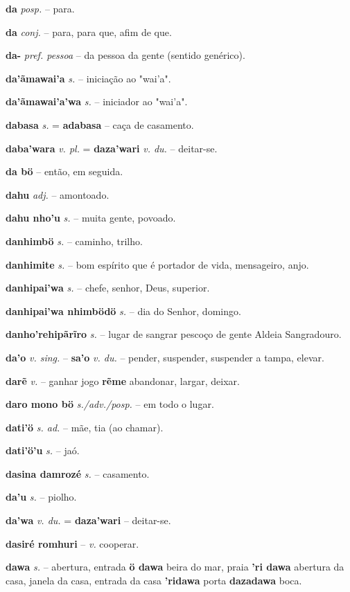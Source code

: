 \textbf{da} \textit{posp.} -- para.

\textbf{da} \textit{conj.} -- para, para que, afim de que.

\textbf{da-} \textit{pref. pessoa} -- da pessoa  da gente (sentido genérico).

\textbf{da'ãmawai'a} \textit{s.} -- iniciação ao "wai'a".

\textbf{da'ãmawai'a'wa} \textit{s.} -- iniciador ao "wai'a".

\textbf{dabasa} \textit{s.} = \textbf{adabasa} -- caça de casamento.

\textbf{daba'wara} \textit{v. pl.} = \textbf{daza'wari} \textit{v. du.} -- deitar-se.

\textbf{da bö} -- então, em seguida.

\textbf{dahu} \textit{adj.} -- amontoado.

\textbf{dahu nho'u} \textit{s.} -- muita gente, povoado.

\textbf{danhimbö} \textit{s.} -- caminho, trilho.

\textbf{danhimite} \textit{s.} -- bom espírito que é portador de vida, mensageiro, anjo.

\textbf{danhipai'wa} \textit{s.} -- chefe, senhor, Deus, superior.

\textbf{danhipai'wa nhimbödö} \textit{s.} -- dia do Senhor, domingo.

\textbf{danho'rehipãrĩro} \textit{s.} -- lugar de sangrar pescoço de gente  Aldeia Sangradouro.

\textbf{da'o} \textit{v. sing.} -- \textbf{sa'o} \textit{v. du.} -- pender, suspender, suspender a tampa, elevar.

\textbf{darẽ} \textit{v.} -- ganhar jogo  \textbf{rẽme} abandonar, largar, deixar.

\textbf{daro mono bö} \textit{s./adv./posp.} -- em todo o lugar.

\textbf{dati'ö} \textit{s. ad.} -- mãe, tia (ao chamar).

\textbf{dati'ö'u} \textit{s.} -- jaó.

\textbf{dasina damrozé} \textit{s.} -- casamento.

\textbf{da'u} \textit{s.} -- piolho.

\textbf{da'wa} \textit{v. du.} = \textbf{daza'wari} -- deitar-se.

\textbf{dasiré romhuri} -- \textit{v.} cooperar.

\textbf{dawa} \textit{s.} -- abertura, entrada  \textbf{ö dawa} beira do mar, praia  \textbf{'ri dawa} abertura da casa, janela da casa, entrada da casa  \textbf{'ridawa} porta  \textbf{dazadawa} boca.


